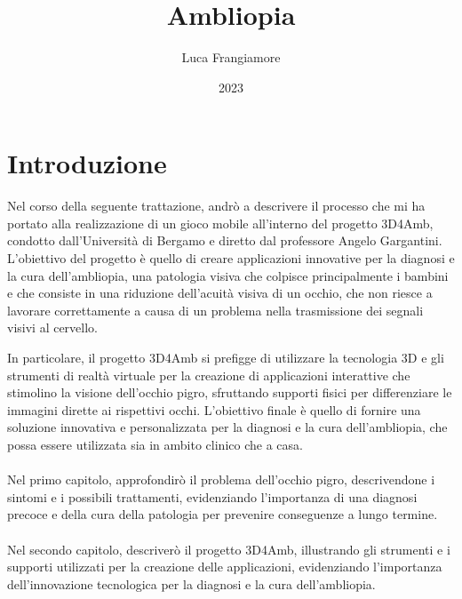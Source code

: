 \documentclass[
a4paper,
cleardoublepage=empty,
headings=twolinechapter,
numbers=autoenddot,
]{scrbook}
\title{Ambliopia}
\author{Luca Frangiamore}
\date{2023}
\begin{document}
	
	\frontmatter
	
	
	\begin{frontespizio}
		\Margini{3cm}{3cm}{3cm}{3cm}
		\Punteggiatura{}
		
	\end{frontespizio}
	
	\tableofcontents
	\listoffigures
	\mainmatter
	
	
	\chapter*{Introduzione}
	Nel corso della seguente trattazione, andrò a descrivere il processo che mi ha portato alla realizzazione di un gioco mobile all'interno del progetto 3D4Amb, condotto dall'Università di Bergamo e diretto dal professore Angelo Gargantini. L'obiettivo del progetto è quello di creare applicazioni innovative per la diagnosi e la cura dell'ambliopia, una patologia visiva che colpisce principalmente i bambini e che consiste in una riduzione dell'acuità visiva di un occhio, che non riesce a lavorare correttamente a causa di un problema nella trasmissione dei segnali visivi al cervello.
	
	In particolare, il progetto 3D4Amb si prefigge di utilizzare la tecnologia 3D e gli strumenti di realtà virtuale per la creazione di applicazioni interattive che stimolino la visione dell'occhio pigro, sfruttando supporti fisici per differenziare le immagini dirette ai rispettivi occhi. L'obiettivo finale è quello di fornire una soluzione innovativa e personalizzata per la diagnosi e la cura dell'ambliopia, che possa essere utilizzata sia in ambito clinico che a casa.\\\\
	
	Nel primo capitolo, approfondirò il problema dell'occhio pigro, descrivendone i sintomi e i possibili trattamenti, evidenziando l'importanza di una diagnosi precoce e della cura della patologia per prevenire conseguenze a lungo termine. \\\\
	Nel secondo capitolo, descriverò il progetto 3D4Amb, illustrando gli strumenti e i supporti utilizzati per la creazione delle applicazioni, evidenziando l'importanza dell'innovazione tecnologica per la diagnosi e la cura dell'ambliopia.\\\\
	
\end{document}

